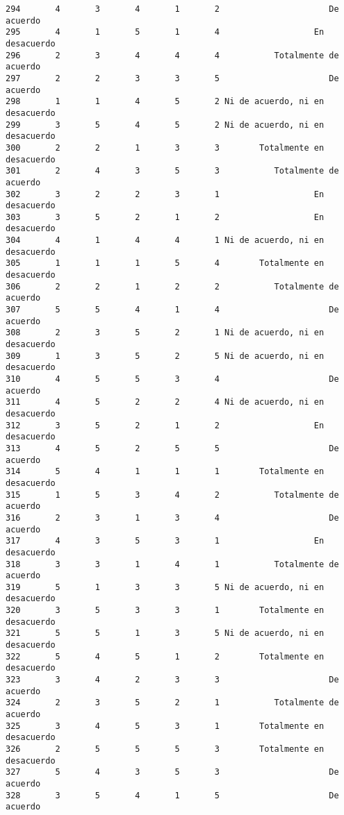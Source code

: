 \documentclass[
  letterpaper,
  DIV=11,
  numbers=noendperiod]{scrartcl}
\begin{document}
\begin{verbatim}
294       4       3       4       1       2                      De acuerdo
295       4       1       5       1       4                   En desacuerdo
296       2       3       4       4       4           Totalmente de acuerdo
297       2       2       3       3       5                      De acuerdo
298       1       1       4       5       2 Ni de acuerdo, ni en desacuerdo
299       3       5       4       5       2 Ni de acuerdo, ni en desacuerdo
300       2       2       1       3       3        Totalmente en desacuerdo
301       2       4       3       5       3           Totalmente de acuerdo
302       3       2       2       3       1                   En desacuerdo
303       3       5       2       1       2                   En desacuerdo
304       4       1       4       4       1 Ni de acuerdo, ni en desacuerdo
305       1       1       1       5       4        Totalmente en desacuerdo
306       2       2       1       2       2           Totalmente de acuerdo
307       5       5       4       1       4                      De acuerdo
308       2       3       5       2       1 Ni de acuerdo, ni en desacuerdo
309       1       3       5       2       5 Ni de acuerdo, ni en desacuerdo
310       4       5       5       3       4                      De acuerdo
311       4       5       2       2       4 Ni de acuerdo, ni en desacuerdo
312       3       5       2       1       2                   En desacuerdo
313       4       5       2       5       5                      De acuerdo
314       5       4       1       1       1        Totalmente en desacuerdo
315       1       5       3       4       2           Totalmente de acuerdo
316       2       3       1       3       4                      De acuerdo
317       4       3       5       3       1                   En desacuerdo
318       3       3       1       4       1           Totalmente de acuerdo
319       5       1       3       3       5 Ni de acuerdo, ni en desacuerdo
320       3       5       3       3       1        Totalmente en desacuerdo
321       5       5       1       3       5 Ni de acuerdo, ni en desacuerdo
322       5       4       5       1       2        Totalmente en desacuerdo
323       3       4       2       3       3                      De acuerdo
324       2       3       5       2       1           Totalmente de acuerdo
325       3       4       5       3       1        Totalmente en desacuerdo
326       2       5       5       5       3        Totalmente en desacuerdo
327       5       4       3       5       3                      De acuerdo
328       3       5       4       1       5                      De acuerdo

\end{verbatim}
\end{document}
